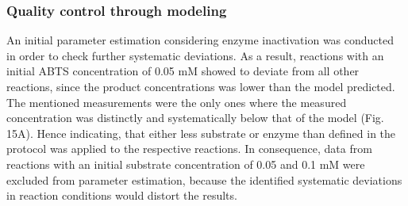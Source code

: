\documentclass[letterpaper,12pt,english]{jupyterBook}
\begin{document}
\subsubsection{Quality control through modeling}
\label{\detokenize{scenarios/enzyme_inactivation:quality-control-through-modeling}}
\sphinxAtStartPar
An initial parameter estimation considering enzyme inactivation was conducted in order to check further systematic deviations. As a result, reactions with an initial ABTS concentration of 0.05 mM showed to deviate from all other reactions, since the product concentrations was lower than the model predicted. The mentioned measurements were the only ones where the measured concentration was distinctly and systematically below that of the model (Fig. 15A). Hence indicating, that either less substrate or enzyme than defined in the protocol was applied to the respective reactions. In consequence, data from reactions with an initial substrate concentration of 0.05 and 0.1 mM were excluded from parameter estimation, because the identified systematic deviations in reaction conditions would distort the results.
\end{document}
